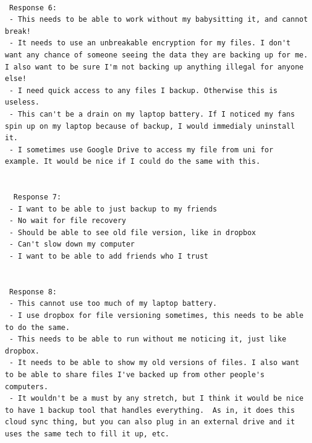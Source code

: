 \documentclass[11pt, a4paper, twoside]{report}
\begin{document}
\begin{lstlisting}[language=RsT, caption=Membrane Feature Survey, label=lst:mbrnsurvey]
  
 Response 6:
 - This needs to be able to work without my babysitting it, and cannot break!
 - It needs to use an unbreakable encryption for my files. I don't want any chance of someone seeing the data they are backing up for me. I also want to be sure I'm not backing up anything illegal for anyone else!
 - I need quick access to any files I backup. Otherwise this is useless.
 - This can't be a drain on my laptop battery. If I noticed my fans spin up on my laptop because of backup, I would immedialy uninstall it.
 - I sometimes use Google Drive to access my file from uni for example. It would be nice if I could do the same with this.
 
 
  Response 7:
 - I want to be able to just backup to my friends
 - No wait for file recovery
 - Should be able to see old file version, like in dropbox
 - Can't slow down my computer
 - I want to be able to add friends who I trust
  
  
 Response 8:
 - This cannot use too much of my laptop battery.
 - I use dropbox for file versioning sometimes, this needs to be able to do the same.
 - This needs to be able to run without me noticing it, just like dropbox.
 - It needs to be able to show my old versions of files. I also want to be able to share files I've backed up from other people's computers.
 - It wouldn't be a must by any stretch, but I think it would be nice to have 1 backup tool that handles everything.  As in, it does this cloud sync thing, but you can also plug in an external drive and it uses the same tech to fill it up, etc.
\end{lstlisting}
\end{document}
